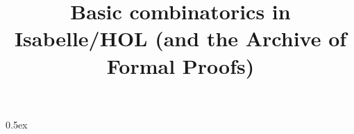 \documentclass[11pt,a4paper]{article}
\begin{document}
\title{Basic combinatorics in Isabelle/HOL (and the Archive of Formal Proofs)}
\maketitle

\tableofcontents

\parindent 0pt \parskip 0.5ex


\end{document}
